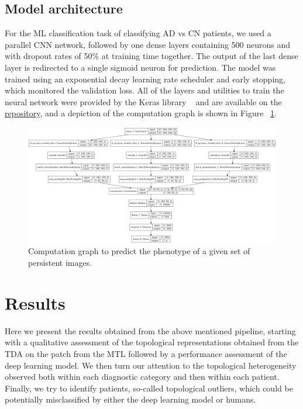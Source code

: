 \documentclass{article}
\begin{document}
\subsection{Model architecture}
For the ML classification task of classifying AD vs CN patients, we used a parallel CNN network, followed by one dense layers containing 500 neurons and with dropout rates of 50\% at training time together. The output of the last dense layer is redirected to a single sigmoid neuron for prediction. The model was trained using an exponential decay learning rate scheduler and early stopping, which monitored the validation loss. All of the layers and utilities to train the neural network were provided by the Keras library ~\citep{chollet2015keras} and are available on the \href{https://github.com/pjhartout/TDA_ADNI_MLCB}{repository}, and a depiction of the computation graph is shown in Figure ~\ref{fig:model_arch}.

\begin{figure}
  \centering
  \includegraphics[width=\textwidth]{figures/model.png}
  \caption{Computation graph to predict the phenotype of a given set of persistent images.}
  \label{fig:model_arch}
\end{figure}

\section{Results}\label{sec:results}

Here we present the results obtained from the above mentioned pipeline, starting with a qualitative assessment of the topological representations obtained from the TDA on the patch from the MTL followed by a performance assessment of the deep learning model. We then turn our attention to the topological heterogeneity observed both within each diagnostic category and then within each patient. Finally, we try to identify patients, so-called topological outliers, which could be potentially misclassified by either the deep learning model or humans.
\end{document}
